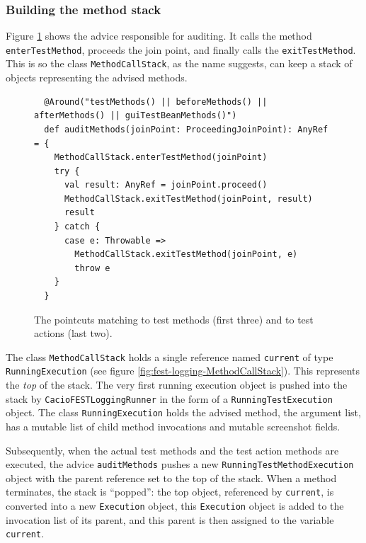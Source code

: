 \subsubsection{Building the method stack}

Figure \ref{fig:fest-logging-auditMethods} shows the advice responsible for auditing. It calls the method \texttt{enterTestMethod}, proceeds the join point, and finally calls the \texttt{exitTestMethod}. This is so the class \texttt{MethodCallStack}, as the name suggests, can keep a stack of objects representing the advised methods.

\begin{figure}[h!]
\centering
\begin{lstlisting}
  @Around("testMethods() || beforeMethods() || afterMethods() || guiTestBeanMethods()")
  def auditMethods(joinPoint: ProceedingJoinPoint): AnyRef = {
    MethodCallStack.enterTestMethod(joinPoint)
    try {
      val result: AnyRef = joinPoint.proceed()
      MethodCallStack.exitTestMethod(joinPoint, result)
      result
    } catch {
      case e: Throwable =>
        MethodCallStack.exitTestMethod(joinPoint, e)
        throw e
    }
  }
\end{lstlisting}
\caption{The pointcuts matching to test methods (first three) and to test actions (last two).}
\label{fig:fest-logging-auditMethods}
\end{figure}

The class \texttt{MethodCallStack} holds a single reference named \texttt{current} of type \texttt{RunningExecution} (see figure \ref{fig:fest-logging-MethodCallStack}). This represents the \emph{top} of the stack. The very first running execution object is pushed into the stack by \texttt{CacioFESTLoggingRunner} in the form of a \texttt{RunningTestExecution} object. The class \texttt{RunningExecution} holds the advised method, the argument list, has a mutable list of child method invocations and mutable screenshot fields. 

Subsequently, when the actual test methods and the test action methods are executed, the advice \texttt{auditMethods} pushes a new \texttt{RunningTestMethodExecution} object with the parent reference set to the top of the stack. When a method terminates, the stack is ``popped'': the top object, referenced by \texttt{current}, is converted into a new \texttt{Execution} object, this \texttt{Execution} object is added to the invocation list of its parent, and this parent is then assigned to the variable \texttt{current}.

